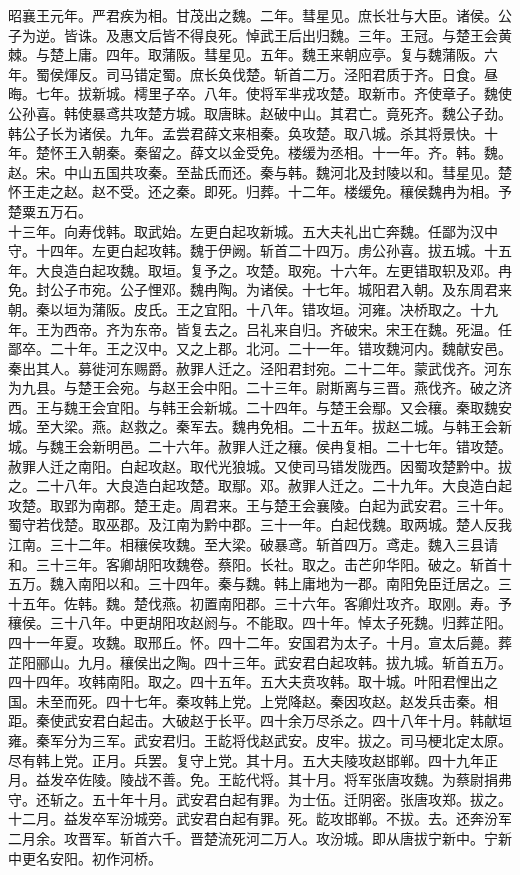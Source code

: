 \documentclass{zhvt-classic}
\begin{document}
\hspace*{2em}昭襄王元年。严君疾为相。甘茂出之魏。二年。彗星见。庶长壮与大臣。诸侯。公子为逆。皆诛。及惠文后皆不得良死。悼武王后出归魏。三年。王冠。与楚王会黄棘。与楚上庸。四年。取蒲阪。彗星见。五年。魏王来朝应亭。复与魏蒲阪。六年。蜀侯煇反。司马错定蜀。庶长奂伐楚。斩首二万。泾阳君质于齐。日食。昼晦。七年。拔新城。樗里子卒。八年。使将军芈戎攻楚。取新市。齐使章子。魏使公孙喜。韩使暴鸢共攻楚方城。取唐眛。赵破中山。其君亡。竟死齐。魏公子劲。韩公子长为诸侯。九年。孟尝君薛文来相秦。奂攻楚。取八城。杀其将景快。十年。楚怀王入朝秦。秦留之。薛文以金受免。楼缓为丞相。十一年。齐。韩。魏。赵。宋。中山五国共攻秦。至盐氏而还。秦与韩。魏河北及封陵以和。彗星见。楚怀王走之赵。赵不受。还之秦。即死。归葬。十二年。楼缓免。穰侯魏冉为相。予楚粟五万石。\\
\hspace*{2em}十三年。向寿伐韩。取武始。左更白起攻新城。五大夫礼出亡奔魏。任鄙为汉中守。十四年。左更白起攻韩。魏于伊阙。斩首二十四万。虏公孙喜。拔五城。十五年。大良造白起攻魏。取垣。复予之。攻楚。取宛。十六年。左更错取轵及邓。冉免。封公子市宛。公子悝邓。魏冉陶。为诸侯。十七年。城阳君入朝。及东周君来朝。秦以垣为蒲阪。皮氏。王之宜阳。十八年。错攻垣。河雍。决桥取之。十九年。王为西帝。齐为东帝。皆复去之。吕礼来自归。齐破宋。宋王在魏。死温。任鄙卒。二十年。王之汉中。又之上郡。北河。二十一年。错攻魏河内。魏献安邑。秦出其人。募徙河东赐爵。赦罪人迁之。泾阳君封宛。二十二年。蒙武伐齐。河东为九县。与楚王会宛。与赵王会中阳。二十三年。尉斯离与三晋。燕伐齐。破之济西。王与魏王会宜阳。与韩王会新城。二十四年。与楚王会鄢。又会穰。秦取魏安城。至大梁。燕。赵救之。秦军去。魏冉免相。二十五年。拔赵二城。与韩王会新城。与魏王会新明邑。二十六年。赦罪人迁之穰。侯冉复相。二十七年。错攻楚。赦罪人迁之南阳。白起攻赵。取代光狼城。又使司马错发陇西。因蜀攻楚黔中。拔之。二十八年。大良造白起攻楚。取鄢。邓。赦罪人迁之。二十九年。大良造白起攻楚。取郢为南郡。楚王走。周君来。王与楚王会襄陵。白起为武安君。三十年。蜀守若伐楚。取巫郡。及江南为黔中郡。三十一年。白起伐魏。取两城。楚人反我江南。三十二年。相穰侯攻魏。至大梁。破暴鸢。斩首四万。鸢走。魏入三县请和。三十三年。客卿胡阳攻魏卷。蔡阳。长社。取之。击芒卯华阳。破之。斩首十五万。魏入南阳以和。三十四年。秦与魏。韩上庸地为一郡。南阳免臣迁居之。三十五年。佐韩。魏。楚伐燕。初置南阳郡。三十六年。客卿灶攻齐。取刚。寿。予穰侯。三十八年。中更胡阳攻赵阏与。不能取。四十年。悼太子死魏。归葬芷阳。四十一年夏。攻魏。取邢丘。怀。四十二年。安国君为太子。十月。宣太后薨。葬芷阳郦山。九月。穰侯出之陶。四十三年。武安君白起攻韩。拔九城。斩首五万。四十四年。攻韩南阳。取之。四十五年。五大夫贲攻韩。取十城。叶阳君悝出之国。未至而死。四十七年。秦攻韩上党。上党降赵。秦因攻赵。赵发兵击秦。相距。秦使武安君白起击。大破赵于长平。四十余万尽杀之。四十八年十月。韩献垣雍。秦军分为三军。武安君归。王龁将伐赵武安。皮牢。拔之。司马梗北定太原。尽有韩上党。正月。兵罢。复守上党。其十月。五大夫陵攻赵邯郸。四十九年正月。益发卒佐陵。陵战不善。免。王龁代将。其十月。将军张唐攻魏。为蔡尉捐弗守。还斩之。五十年十月。武安君白起有罪。为士伍。迁阴密。张唐攻郑。拔之。十二月。益发卒军汾城旁。武安君白起有罪。死。龁攻邯郸。不拔。去。还奔汾军二月余。攻晋军。斩首六千。晋楚流死河二万人。攻汾城。即从唐拔宁新中。宁新中更名安阳。初作河桥。\\
\end{document}
